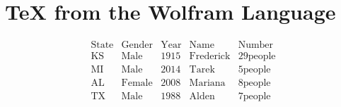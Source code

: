 \documentclass[12pt]{article}
\begin{document}
\section*{TeX from the Wolfram Language}
\[
\begin{array}{lllll}
 \text{State} & \text{Gender} & \text{Year} & \text{Name} & \text{Number} \\
 \text{KS} & \text{Male} & 1915 & \text{Frederick} & 29\text{people} \\
 \text{MI} & \text{Male} & 2014 & \text{Tarek} & 5\text{people} \\
 \text{AL} & \text{Female} & 2008 & \text{Mariana} & 8\text{people} \\
 \text{TX} & \text{Male} & 1988 & \text{Alden} & 7\text{people} \\
\end{array}
\]
\end{document}
